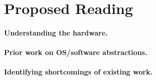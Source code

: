 \section{Proposed Reading}
\label{sec:reading}

\paragraph{Understanding the hardware.}

\paragraph{Prior work on OS/software abstractions.}

\paragraph{Identifying shortcomings of existing work.}
